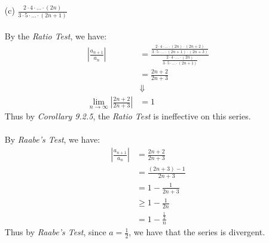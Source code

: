 \documentclass[12pt,letterpaper]{article}
\newcommand{\limx}[2]{\displaystyle\lim\limits_{#1 \to #2}}
\newcommand{\abs}[1]{\left\lvert #1 \right\rvert}
\theoremstyle{case}
\theoremstyle{definition}
\begin{document}
\begin{enumerate}
\begin{enumerate}
\begin{enumerate}
				\item[(c)] $\displaystyle\frac{2\cdot4\cdot\dots\cdot(2n)}{3\cdot5\cdot\dots\cdot(2n+1)}$
				\\\\By the \textit{Ratio Test}, we have:
				\begin{align*}
					\abs{\frac{a_{n+1}}{a_n}} &= \frac{\displaystyle\frac{2 \cdot 4 \cdot \dots \cdot (2n) \cdot (2n+2)}{3 \cdot 5 \cdot \dots \cdot (2n+1) \cdot (2n+3)}}{\displaystyle\frac{2 \cdot 4 \cdot \dots \cdot (2n)}{3 \cdot 5 \cdot \dots \cdot (2n+1)}} \\
					&= \frac{2n+2}{2n+3} \\
					&\Downarrow \\
					\limx{n}{\infty} \abs{\frac{2n+2}{2n+3}} &= 1
				\end{align*}
				Thus by \textit{Corollary 9.2.5}, the \textit{Ratio Test} is ineffective on this series.
				\\\\By \textit{Raabe's Test}, we have:
				\begin{align*}
					\abs{\frac{a_{n+1}}{a_n}} &= \frac{2n+2}{2n+3} \\
					&= \frac{(2n+3)-1}{2n+3} \\
					&= 1-\frac{1}{2n+3} \\
					&\geq 1-\frac{1}{2n} \\
					&= 1-\frac{\frac{1}{2}}{n}
				\end{align*}
				Thus by \textit{Raabe's Test}, since $a=\frac{1}{2}$, we have that the series is divergent.\\
				

\end{enumerate}
\end{enumerate}
\end{enumerate}
\end{document}
